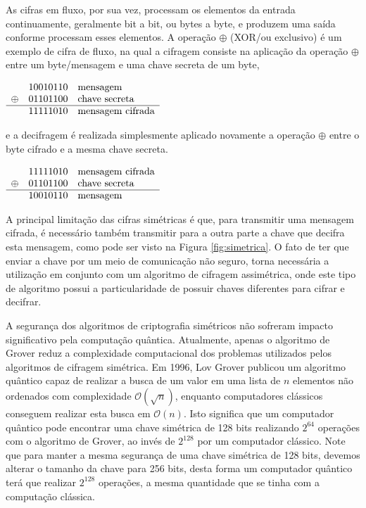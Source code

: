     As cifras em fluxo, por sua vez, processam os elementos da entrada continuamente, geralmente bit a bit, ou bytes a byte, e produzem uma saída conforme processam esses elementos. A operação $\oplus$ (XOR/ou exclusivo) é um exemplo de cifra de fluxo, na qual a cifragem consiste na aplicação da operação $\oplus$ entre um byte/mensagem e uma chave secreta de um byte,

    \begin{center}
        $\begin{array}{cll}
                   & 10010110 & \textrm{mensagem}\\
            \oplus & 01101100 & \textrm{chave secreta}\\
            \hline
                   & 11111010 & \textrm{mensagem cifrada}
        \end{array}$
    \end{center}

    \noindent
    e a decifragem é realizada simplesmente aplicado novamente a operação $\oplus$ entre o byte cifrado e a mesma chave secreta.
    
    \begin{center}
        $\begin{array}{cll}
                   & 11111010 & \textrm{mensagem cifrada}\\
            \oplus & 01101100 & \textrm{chave secreta}\\
            \hline
                   & 10010110 & \textrm{mensagem}
        \end{array}$
    \end{center}
    
    A principal limitação das cifras simétricas é que, para transmitir uma mensagem cifrada, é necessário também transmitir para a outra parte a chave que decifra esta mensagem, como pode ser visto na Figura \ref{fig:simetrica}. O fato de ter que enviar a chave por um meio de comunicação não seguro, torna necessária a utilização em conjunto com um algoritmo de cifragem assimétrica, onde este tipo de algoritmo possui a particularidade de possuir chaves diferentes para cifrar e decifrar.

    A segurança dos algoritmos de criptografia simétricos não sofreram impacto significativo pela computação quântica. Atualmente, apenas o algoritmo de Grover \cite{grover} reduz a complexidade computacional dos problemas utilizados pelos algoritmos de cifragem simétrica. Em 1996, Lov Grover publicou um algoritmo quântico capaz de realizar a busca de um valor em uma lista de $n$ elementos não ordenados com complexidade $\mathcal{O}(\sqrt{n})$, enquanto computadores clássicos conseguem realizar esta busca em $\mathcal{O}(n)$. Isto significa que um computador quântico pode encontrar uma chave simétrica de 128 bits realizando $2^{64}$ operações com o algoritmo de Grover, ao invés de $2^{128}$ por um computador clássico. Note que para manter a mesma segurança de uma chave simétrica de 128 bits, devemos alterar o tamanho da chave para 256 bits, desta forma um computador quântico terá que realizar $2^{128}$ operações, a mesma quantidade que se tinha com a computação clássica.


